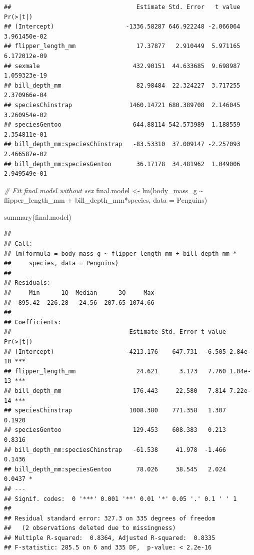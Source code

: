 \documentclass[
]{article}
\newenvironment{Shaded}{\begin{snugshade}}{\end{snugshade}}
\newcommand{\AttributeTok}[1]{\textcolor[rgb]{0.77,0.63,0.00}{#1}}
\newcommand{\CommentTok}[1]{\textcolor[rgb]{0.56,0.35,0.01}{\textit{#1}}}
\newcommand{\FunctionTok}[1]{\textcolor[rgb]{0.00,0.00,0.00}{#1}}
\newcommand{\NormalTok}[1]{#1}
\newcommand{\OtherTok}[1]{\textcolor[rgb]{0.56,0.35,0.01}{#1}}
\newcommand{\SpecialCharTok}[1]{\textcolor[rgb]{0.00,0.00,0.00}{#1}}
\begin{document}
\begin{verbatim}
##                                   Estimate Std. Error   t value     Pr(>|t|)
## (Intercept)                    -1336.58287 646.922248 -2.066064 3.961450e-02
## flipper_length_mm                 17.37877   2.910449  5.971165 6.172012e-09
## sexmale                          432.90151  44.633685  9.698987 1.059323e-19
## bill_depth_mm                     82.98484  22.324227  3.717255 2.370966e-04
## speciesChinstrap                1460.14721 680.389708  2.146045 3.260954e-02
## speciesGentoo                    644.88114 542.573989  1.188559 2.354811e-01
## bill_depth_mm:speciesChinstrap   -83.53310  37.009147 -2.257093 2.466587e-02
## bill_depth_mm:speciesGentoo       36.17178  34.481962  1.049006 2.949549e-01
\end{verbatim}

\begin{Shaded}
\begin{Highlighting}[]
\CommentTok{\# Fit final model without sex}
\NormalTok{final.model }\OtherTok{\textless{}{-}} \FunctionTok{lm}\NormalTok{(body\_mass\_g }\SpecialCharTok{\textasciitilde{}}\NormalTok{ flipper\_length\_mm }\SpecialCharTok{+}\NormalTok{ bill\_depth\_mm}\SpecialCharTok{*}\NormalTok{species, }
                  \AttributeTok{data =}\NormalTok{ Penguins)}

\FunctionTok{summary}\NormalTok{(final.model)}
\end{Highlighting}
\end{Shaded}

\begin{verbatim}
## 
## Call:
## lm(formula = body_mass_g ~ flipper_length_mm + bill_depth_mm * 
##     species, data = Penguins)
## 
## Residuals:
##     Min      1Q  Median      3Q     Max 
## -895.42 -226.28  -24.56  207.65 1074.66 
## 
## Coefficients:
##                                 Estimate Std. Error t value Pr(>|t|)    
## (Intercept)                    -4213.176    647.731  -6.505 2.84e-10 ***
## flipper_length_mm                 24.621      3.173   7.760 1.04e-13 ***
## bill_depth_mm                    176.443     22.580   7.814 7.22e-14 ***
## speciesChinstrap                1008.380    771.358   1.307   0.1920    
## speciesGentoo                    129.453    608.383   0.213   0.8316    
## bill_depth_mm:speciesChinstrap   -61.538     41.978  -1.466   0.1436    
## bill_depth_mm:speciesGentoo       78.026     38.545   2.024   0.0437 *  
## ---
## Signif. codes:  0 '***' 0.001 '**' 0.01 '*' 0.05 '.' 0.1 ' ' 1
## 
## Residual standard error: 327.3 on 335 degrees of freedom
##   (2 observations deleted due to missingness)
## Multiple R-squared:  0.8364, Adjusted R-squared:  0.8335 
## F-statistic: 285.5 on 6 and 335 DF,  p-value: < 2.2e-16
\end{verbatim}
\end{document}
